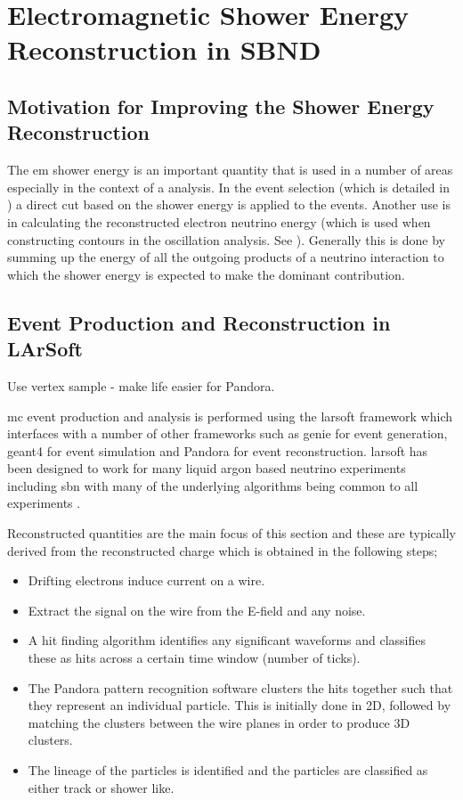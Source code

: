 \chapter{Electromagnetic Shower Energy Reconstruction in SBND}
\label{chap:Energy_Reco}
\section{Motivation for Improving the Shower Energy Reconstruction}

The \gls{em} shower energy is an important quantity that is used in a number of areas especially in the context of a \nue analysis. In the \nue event selection (which is detailed in ) a direct cut based on the shower energy is applied to the events. Another use is in calculating the reconstructed electron neutrino energy (which is used when constructing contours in the oscillation analysis. See ). Generally this is done by summing up the energy of all the outgoing products of a neutrino interaction to which the shower energy is expected to make the dominant contribution.

\section{Event Production and Reconstruction in LArSoft}\label{sec:Event Production and Reconstruction in LArSoft}

Use vertex sample - make life easier for Pandora.

\gls{mc} event production and analysis is performed using the \gls{larsoft} framework which interfaces with a number of other frameworks such as \gls{genie} for event generation, \gls{geant4} for event simulation and Pandora for event reconstruction. \gls{larsoft} has been designed to work for many liquid argon based neutrino experiments including \gls{sbn} with many of the underlying algorithms being common to all experiments \cite{larsoft}\cite{larsoft_paper}.

Reconstructed quantities are the main focus of this section and these are typically derived from the reconstructed charge which is obtained in the following steps;
\begin{itemize}
    \item Drifting electrons induce current on a wire.
    \item Extract the signal on the wire from the E-field and any noise. 
    \item A hit finding algorithm identifies any significant waveforms and classifies these as hits across a certain time window (number of ticks). 
    \item The Pandora pattern recognition software clusters the hits together such that they represent an individual particle. This is initially done in 2D, followed by matching the clusters between the wire planes in order to produce 3D clusters.
    \item The lineage of the particles is identified and the particles are classified as either track or shower like.
\end{itemize}

